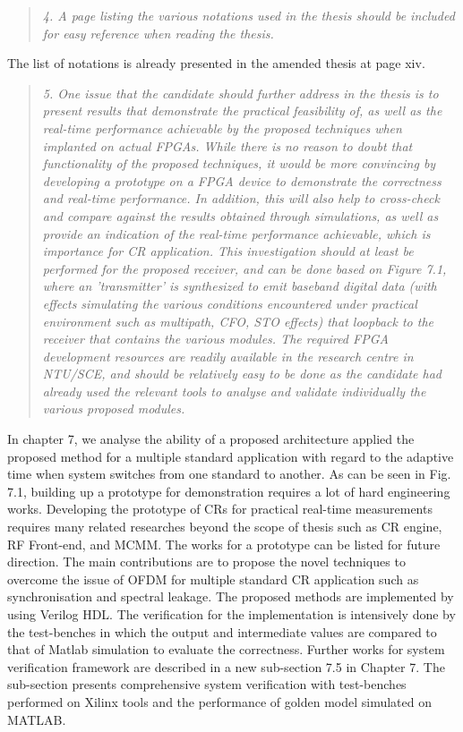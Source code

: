 \documentclass{article}
\begin{document}
\begin{quote}
\emph{4. A page listing the various notations used in the thesis should be included for easy reference when reading the thesis.}
\end{quote}
The list of notations is already presented in the amended thesis at page xiv.

\begin{quote}
\emph{5. One issue that the candidate should further address in the thesis is to present results that demonstrate the practical feasibility of, as well as the real-time performance achievable by the proposed techniques when implanted on actual FPGAs. While there is no reason to doubt that functionality of the proposed techniques, it would be more convincing by developing a prototype on a FPGA device to demonstrate the correctness and real-time performance. In addition, this will also help to cross-check and compare against the results obtained through simulations, as well as provide an indication of the real-time performance achievable, which is importance for CR application. This investigation should at least be performed for the proposed receiver, and can be done based on Figure 7.1, where an 'transmitter' is synthesized to emit baseband digital data (with effects simulating the various conditions encountered under practical environment such as multipath, CFO, STO effects) that loopback to the receiver that contains the various modules. The required FPGA development resources are readily available in the research centre in NTU/SCE, and should be relatively easy to be done as the candidate had already used the relevant tools to analyse and validate individually the various proposed modules.}
\end{quote}
In chapter 7, we analyse the ability of a proposed architecture applied the proposed method for a multiple standard application with regard to the adaptive time when system switches from one standard to another. As can be seen in Fig. 7.1, building up a prototype for demonstration requires a lot of hard engineering works.
Developing the prototype of CRs for practical real-time measurements requires many related researches beyond the scope of thesis such as CR engine, RF Front-end, and MCMM. The works for a prototype can be listed for future direction.
The main contributions are to propose the novel techniques to overcome the issue of OFDM for multiple standard CR application such as synchronisation and spectral leakage. The proposed methods are implemented by using Verilog HDL. The verification for the implementation is intensively done by the test-benches in which the output and intermediate values are compared to that of Matlab simulation to evaluate the correctness. Further works for system verification framework are described in a new sub-section 7.5 in Chapter 7. The sub-section presents comprehensive system verification with test-benches performed on Xilinx tools and the performance of golden model simulated on MATLAB.
\end{document}

